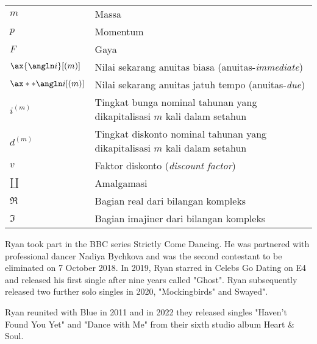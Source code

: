 \documentclass{SkripsiUnesa}
\begin{document}
\DaftarIsi
\DaftarTabel
\DaftarGambar
\DaftarSimbol
\renewcommand{\arraystretch}{1.2}
\begin{tabular}{p{} p{}}
	$m$ & Massa\\
	$p$ & Momentum\\
	$F$ & Gaya\\
	$\ax{\angln i}[\left(m\right)]$ & Nilai sekarang anuitas biasa (anuitas-\textit{immediate})\\
	$\ax**{\angln i}[\left(m\right)]$ & Nilai sekarang anuitas jatuh tempo (anuitas-\textit{due})\\
	$i^{(m)}$ & Tingkat bunga nominal tahunan yang dikapitalisasi $m$ kali dalam setahun\\
	$d^{(m)}$ & Tingkat diskonto nominal tahunan yang dikapitalisasi $m$ kali dalam setahun\\
	$v$ & Faktor diskonto (\textit{discount factor})\\
	$\amalg$ & Amalgamasi\\
	$\Re$ & Bagian real dari bilangan kompleks\\
	$\Im$ & Bagian imajiner dari bilangan kompleks 
\end{tabular}
\newpage

\Inti











\nocite{*}

\Glosarium
\BukaLampiran

\UjiAhli



Ryan took part in the BBC series Strictly Come Dancing. He was partnered with professional dancer Nadiya Bychkova and was the second contestant to be eliminated on 7 October 2018. In 2019, Ryan starred in Celebs Go Dating on E4 and released his first single after nine years called "Ghost". Ryan subsequently released two further solo singles in 2020, "Mockingbirds" and Swayed".

Ryan reunited with Blue in 2011 and in 2022 they released singles "Haven't Found You Yet" and "Dance with Me" from their sixth studio album Heart \& Soul.
\end{document}
